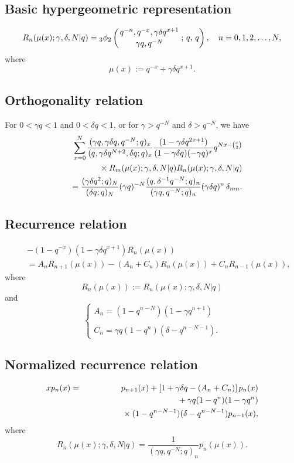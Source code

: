 \documentclass[envcountchap,graybox]{svmono}
\newcommand{\qhyp}[5]{\mbox{}_{#1}{\phi}_{#2}
\left(\genfrac{}{}{0pt}{}{#3}{#4}\,;\,q,\,#5\right)}
\newcommand{\mathindent}{\hspace{7.5mm}}
\newcommand{\qhyp}[5]{\,\mbox{}_{#1}\phi_{#2}\!\left(
  \genfrac{}{}{0pt}{}{#3}{#4};#5\right)}
\begin{document}
\subsection*{Basic hypergeometric representation}
\begin{equation}
\label{DefDualqHahn}
R_n(\mu(x);\gamma,\delta,N|q)=
\qhyp{3}{2}{q^{-n},q^{-x},\gamma\delta q^{x+1}}{\gamma q,q^{-N}}{q},\quad n=0,1,2,\ldots,N,
\end{equation}
where
$$\mu(x):=q^{-x}+\gamma\delta q^{x+1}.$$

\newpage

\subsection*{Orthogonality relation}
For $0<\gamma q<1$ and $0<\delta q<1$, or for $\gamma>q^{-N}$ and $\delta>q^{-N}$, we have
\begin{eqnarray}
\label{OrtDualqHahn}
& &\sum_{x=0}^N\frac{(\gamma q,\gamma\delta q,q^{-N};q)_x}{(q,\gamma\delta q^{N+2},\delta q;q)_x}
\frac{(1-\gamma\delta q^{2x+1})}{(1-\gamma\delta q)(-\gamma q)^x}q^{Nx-\binom{x}{2}}\nonumber\\
& &{}\mathindent{}\times R_m(\mu(x);\gamma,\delta,N|q)R_n(\mu(x);\gamma,\delta,N|q)\nonumber\\
& &{}=\frac{(\gamma\delta q^2;q)_N}{(\delta q;q)_N}(\gamma q)^{-N}
\frac{(q,\delta^{-1}q^{-N};q)_n}{(\gamma q,q^{-N};q)_n}(\gamma\delta q)^n\,\delta_{mn}.
\end{eqnarray}

\subsection*{Recurrence relation}
\begin{eqnarray}
\label{RecDualqHahn}
& &-\left(1-q^{-x}\right)\left(1-\gamma\delta q^{x+1}\right)R_n(\mu(x))\nonumber\\
& &{}=A_nR_{n+1}(\mu(x))-\left(A_n+C_n\right)R_n(\mu(x))+C_nR_{n-1}(\mu(x)),
\end{eqnarray}
where
$$R_n(\mu(x)):=R_n(\mu(x);\gamma,\delta,N|q)$$
and
$$\left\{\begin{array}{l}
\displaystyle A_n=\left(1-q^{n-N}\right)\left(1-\gamma q^{n+1}\right)\\
\\
\displaystyle C_n=\gamma q\left(1-q^n\right)\left(\delta -q^{n-N-1}\right).
\end{array}\right.$$

\subsection*{Normalized recurrence relation}
\begin{eqnarray}
\label{NormRecDualqHahn}
xp_n(x)&=&p_{n+1}(x)+\left[1+\gamma\delta q-(A_n+C_n)\right]p_n(x)\nonumber\\
& &{}\mathindent{}+\gamma q(1-q^n)(1-\gamma q^n)\nonumber\\
& &{}\mathindent\mathindent{}\times(1-q^{n-N-1})(\delta-q^{n-N-1})p_{n-1}(x),
\end{eqnarray}
where
$$R_n(\mu(x);\gamma,\delta,N|q)=\frac{1}{(\gamma q,q^{-N};q)_n}p_n(\mu(x)).$$
\end{document}
